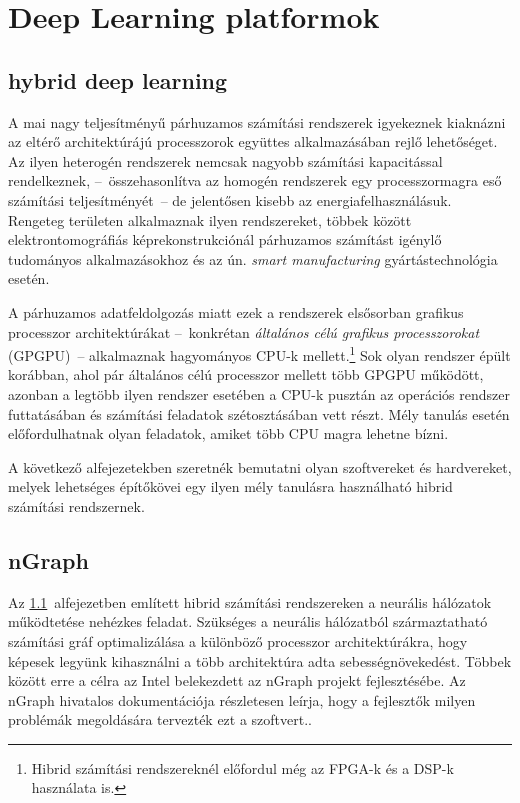 \chapter{Deep Learning platformok}
\section{hybrid deep learning} \label{sect:hybridDL}
A mai nagy teljesítményű párhuzamos számítási rendszerek igyekeznek kiaknázni az eltérő architektúrájú processzorok együttes alkalmazásában rejlő lehetőséget. Az ilyen heterogén rendszerek nemcsak nagyobb számítási kapacitással rendelkeznek, --~összehasonlítva az homogén rendszerek egy processzormagra eső számítási teljesítményét~-- de jelentősen kisebb az energiafelhasználásuk. Rengeteg területen alkalmaznak ilyen rendszereket, többek között elektrontomográfiás képrekonstrukciónál\cite{agulleiro2012} párhuzamos számítást igénylő tudományos alkalmazásokhoz\cite{meredith2011} és az ún. \emph{smart manufacturing} gyártástechnológia esetén.\cite{li2019}

A párhuzamos adatfeldolgozás miatt ezek a rendszerek elsősorban grafikus processzor architektúrákat --~konkrétan \emph{általános célú grafikus processzorokat} (GPGPU)~-- alkalmaznak hagyományos CPU-k mellett.\footnote{Hibrid számítási rendszereknél előfordul még az FPGA-k és a DSP-k használata is.} Sok olyan rendszer épült korábban, ahol pár általános célú processzor mellett több GPGPU működött, azonban a legtöbb ilyen rendszer esetében a CPU-k pusztán az operációs rendszer futtatásában és számítási feladatok szétosztásában vett részt. Mély tanulás esetén előfordulhatnak olyan feladatok, amiket több CPU magra lehetne bízni.

A következő alfejezetekben szeretnék bemutatni olyan szoftvereket és hardvereket, melyek lehetséges építőkövei egy ilyen mély tanulásra használható hibrid számítási rendszernek.

\section{nGraph}
Az \ref{sect:hybridDL}~alfejezetben említett hibrid számítási rendszereken a neurális hálózatok működtetése nehézkes feladat. Szükséges a neurális hálózatból származtatható számítási gráf optimalizálása a különböző processzor architektúrákra, hogy képesek legyünk kihasználni a több architektúra adta sebességnövekedést. Többek között erre a célra az Intel belekezdett az nGraph projekt fejlesztésébe. Az nGraph hivatalos dokumentációja részletesen leírja, hogy a fejlesztők milyen problémák megoldására tervezték ezt a szoftvert.\cite{web:ngraph_intro}.

